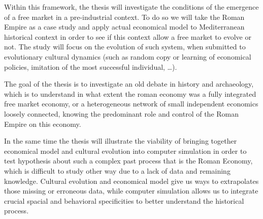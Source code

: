 \documentclass[a4paper]{article}
\begin{document}
Within this framework, the thesis will investigate the conditions of the emergence of a free market in a pre-industrial context. To do so we will take the Roman Empire as a case study and apply actual economical model to Mediterranean historical context in order to see if this context allow a free market to evolve or not. The study will focus on the evolution of such system, when submitted to evolutionary cultural dynamics (such as random copy or learning of economical policies, imitation of the most successful individual, \ldots).



The goal of the thesis is to investigate an old debate in history and archaeology, which is to understand in what extent the roman economy was a fully integrated free market economy, or a heterogeneous network of small independent economics loosely connected, knowing the predominant role and control of the Roman Empire on this economy. 
 
In the same time the thesis will illustrate the viability of bringing together economical model and cultural evolution into computer simulation in order to test hypothesis about such a complex past process that is the Roman Economy, which is difficult to study other way due to a lack of data and remaining knowledge. Cultural evolution and economical model give us ways to extrapolates those missing or erroneous data, while computer simulation allows us to integrate crucial spacial and behavioral specificities to better understand the historical process.


\end{document}
